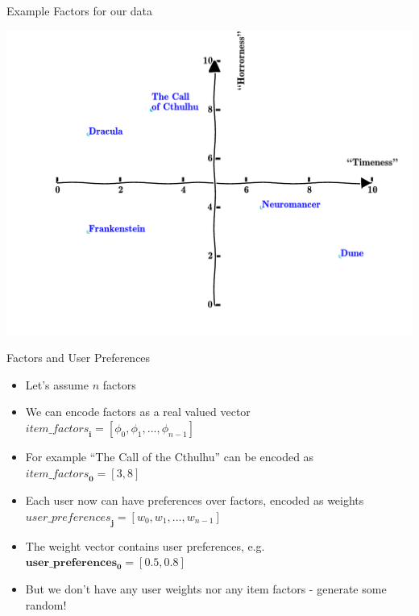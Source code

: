 \documentclass[obeyspaces]{beamer}
\providecommand{\tightlist}{%
  \setlength{\itemsep}{0pt}\setlength{\parskip}{0pt}}
\newcommand{\vect}[1]{\boldsymbol{#1}} %
\begin{document}
\begin{frame}{Example Factors for our data}

\includegraphics[width=\textwidth]{./graphics/lec5/books.pdf}

\end{frame}

\begin{frame}{Factors and User Preferences}

\begin{itemize}
\tightlist
\item
  Let's assume \(n\) factors
\item
  We can encode factors as a real valued vector
  \(\vect{\mathit{item\_factors}_i}= [\phi_0, \phi_1, ... , \phi_{n-1}]\)
\item
  For example ``The Call of the Cthulhu'' can be encoded as
  \(\vect{\mathit{item\_factors}_{0}} = [3,8]\)
\item
  Each user now can have preferences over factors, encoded as weights
  \(\vect{\mathit{user\_preferences}_j} = [w_0, w_1, ... , w_{n-1}]\)
\item
  The weight vector contains user preferences, e.g.
  \(\vect{user\_preferences_{0}} = [0.5,0.8]\)
\item
  But we don't have any user weights nor any item factors - generate
  some random!
\end{itemize}

\end{frame}
\end{document}

